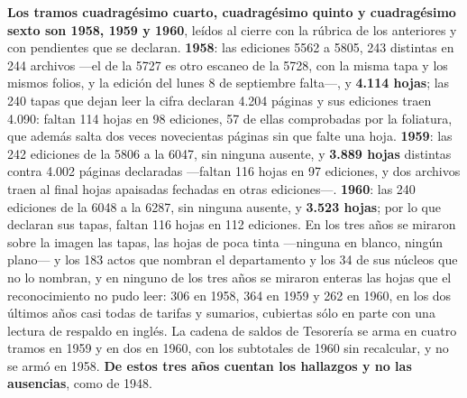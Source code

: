 \textbf{Los tramos cuadragésimo cuarto, cuadragésimo quinto y cuadragésimo sexto son 1958, 1959 y 1960}, leídos al cierre con la rúbrica de los anteriores y con pendientes que se declaran. \textbf{1958}: las ediciones 5562 a 5805, 243 distintas en 244 archivos ---el de la 5727 es otro escaneo de la 5728, con la misma tapa y los mismos folios, y la edición del lunes 8 de septiembre falta---, y \textbf{4.114 hojas}; las 240 tapas que dejan leer la cifra declaran 4.204 páginas y sus ediciones traen 4.090: faltan 114 hojas en 98 ediciones, 57 de ellas comprobadas por la foliatura, que además salta dos veces novecientas páginas sin que falte una hoja. \textbf{1959}: las 242 ediciones de la 5806 a la 6047, sin ninguna ausente, y \textbf{3.889 hojas} distintas contra 4.002 páginas declaradas ---faltan 116 hojas en 97 ediciones, y dos archivos traen al final hojas apaisadas fechadas en otras ediciones---. \textbf{1960}: las 240 ediciones de la 6048 a la 6287, sin ninguna ausente, y \textbf{3.523 hojas}; por lo que declaran sus tapas, faltan 116 hojas en 112 ediciones. En los tres años se miraron sobre la imagen las tapas, las hojas de poca tinta ---ninguna en blanco, ningún plano--- y los 183 actos que nombran el departamento y los 34 de sus núcleos que no lo nombran, y en ninguno de los tres años se miraron enteras las hojas que el reconocimiento no pudo leer: 306 en 1958, 364 en 1959 y 262 en 1960, en los dos últimos años casi todas de tarifas y sumarios, cubiertas sólo en parte con una lectura de respaldo en inglés. La cadena de saldos de Tesorería se arma en cuatro tramos en 1959 y en dos en 1960, con los subtotales de 1960 sin recalcular, y no se armó en 1958. \textbf{De estos tres años cuentan los hallazgos y no las ausencias}, como de 1948.

